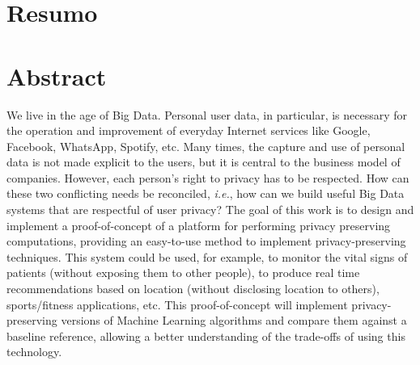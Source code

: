 %

\chapter*{Resumo} %
\thispagestyle{empty}



\newpage

\chapter*{Abstract} %
\thispagestyle{empty}

We live in the age of Big Data. Personal user data, in particular, is necessary for the operation and improvement of everyday Internet services like Google, Facebook, WhatsApp, Spotify, etc. Many times, the capture and use of personal data is not made explicit to the users, but it is central to the business model of companies. However, each person’s right to privacy has to be respected. How can these two conflicting needs be reconciled, \textit{i.e.}, how can we build useful Big Data systems that are respectful of user privacy?
The goal of this work is to design and implement a proof-of-concept of a platform for performing privacy preserving computations, providing an easy-to-use method to implement privacy-preserving techniques. This system could be used, for example, to monitor the vital signs of patients (without exposing them to other people), to produce real time recommendations based on location (without disclosing location to others), sports/fitness applications, etc.
This proof-of-concept will implement privacy-preserving versions of Machine Learning algorithms and compare them against a baseline reference, allowing a better understanding of the trade-offs of using this technology. 

\newpage

